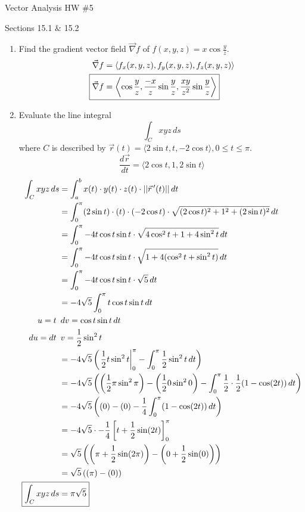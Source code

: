 \documentclass{article}
\begin{document}
\begin{center}
    Vector Analysis HW \#5
    
    Sections 15.1 $\&$ 15.2
\end{center}
\begin{enumerate}
    \item Find the gradient vector field $\Vec{\nabla}f$ of $f(x,y,z)=x\cos{\frac{y}{z}}$.
    \begin{align*}
    &\Vec{\nabla}f=\langle f_x(x,y,z),f_y(x,y,z),f_z(x,y,z)\rangle\\
\Aboxed{ &\Vec{\nabla}f=\left\langle \cos{\frac{y}{z}},\frac{-x}{z}\sin{\frac{y}{z}},\frac{xy}{z^2}\sin{\frac{y}{z}}\right\rangle}\\
    \end{align*}

    \item Evaluate the line integral $$\int_C xyz\, ds$$ where $C$ is described by $\Vec{r}(t)=\langle 2\sin{t},t,-2\cos{t}\rangle,0\le t\le \pi$.
    $$\frac{d\Vec{r}}{dt}=\langle 2\cos{t}, 1, 2\sin t\rangle$$
    \begin{align*}
    \int_C xyz\, ds &=\int_a^b x(t)\cdot y(t)\cdot z(t)\cdot ||\Vec{r}\,'(t)||\,dt\\
    &=\int_0^\pi (2\sin t)\cdot (t)\cdot (-2\cos t)\cdot \sqrt{(2\cos{t})^2+ 1^2+ (2\sin t)^2}\,dt\\
    &=\int_0^\pi -4t\cos t\sin t\cdot \sqrt{4\cos^2{t}+ 1+ 4\sin ^2t}\,dt\\
    &=\int_0^\pi -4t\cos t\sin t\cdot \sqrt{1+ 4(\cos^2{t}+ \sin ^2t)}\,dt\\
    &=\int_0^\pi -4t\cos t\sin t\cdot \sqrt{5}\,dt\\
    &=-4\sqrt{5}\int_0^\pi t\cos t\sin t\,dt\\
    u=t \,\,&\, dv=\cos t\sin t\,dt\\
    du=dt \,\,&\, v=\frac{1}{2}\sin ^2t\\
    &=-4\sqrt{5}\left(\left.\frac{1}{2}t\sin ^2t\right|_0^\pi-\int_0^\pi \frac{1}{2}\sin ^2 t \, dt\right)\\
    &=-4\sqrt{5}\left(\left(\frac{1}{2}\pi\sin ^2\pi\right)-\left(\frac{1}{2}0\sin ^20\right)-\int_0^\pi \frac{1}{2}\cdot \frac{1}{2}(1-\cos(2t))\, dt\right)\\
    &=-4\sqrt{5}\left((0)-(0)-\frac{1}{4}\int_0^\pi (1-\cos(2t))\, dt\right)\\
    &=-4\sqrt{5}\cdot -\frac{1}{4}\left[t+\frac{1}{2}\sin (2t)\right]_0^\pi\\
    &=\sqrt{5}\left(\left(\pi+\frac{1}{2}\sin (2\pi)\right)-\left(0+\frac{1}{2}\sin (0)\right)\right)\\
    &=\sqrt{5}\left(\left(\pi\right)-\left(0\right)\right)\\
\Aboxed{\int_C xyz\, ds &=\pi\sqrt{5}}\\
    \end{align*}


\end{enumerate}
\end{document}

